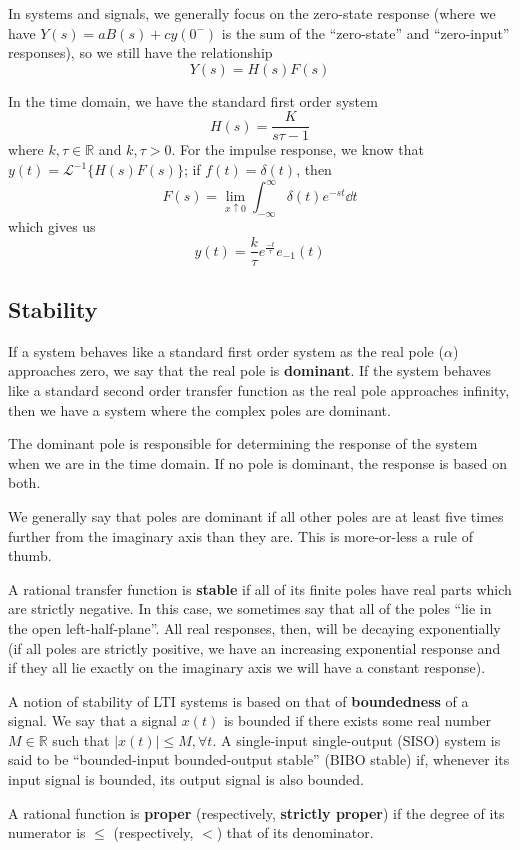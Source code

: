 \documentclass[12pt]{article}
\begin{document}
In systems and signals, we generally focus on the zero-state response (where we have $Y(s) = aB(s) + cy(0^-)$ is the sum of the ``zero-state'' and ``zero-input'' responses), so we still have the relationship \[ Y(s) = H(s)F(s) \]

In the time domain, we have the standard first order system \[ H(s) = \frac{K}{s\tau - 1} \] where $k, \tau \in \mathbb{R}$ and $k, \tau > 0$. For the impulse response, we know that $y(t) = \mathcal{L}^{-1} \{ H(s)F(s) \}$; if $f(t) = \delta(t)$, then \[ F(s) = \lim_{x\uparrow 0} \int_{-\infty}^\infty \delta(t) e^{-st} \dd t \] which gives us \[ y(t) = \frac{k}{\tau} e^{\frac{-t}{\tau}} e_{-1}(t) \]

\subsection{Stability}
If a system behaves like a standard first order system as the real pole ($\alpha$) approaches zero, we say that the real pole is {\bf dominant}. If the system behaves like a standard second order transfer function as the real pole approaches infinity, then we have a system where the complex poles are dominant.

The dominant pole is responsible for determining the response of the system when we are in the time domain. If no pole is dominant, the response is based on both.

We generally say that poles are dominant if all other poles are at least five times further from the imaginary axis than they are. This is more-or-less a rule of thumb.

A rational transfer function is {\bf stable} if all of its finite poles have real parts which are strictly negative. In this case, we sometimes say that all of the poles ``lie in the open left-half-plane''. All real responses, then, will be decaying exponentially (if all poles are strictly positive, we have an increasing exponential response and if they all lie exactly on the imaginary axis we will have a constant response).

A notion of stability of LTI systems is based on that of {\bf boundedness} of a signal. We say that a signal $x(t)$ is bounded if there exists some real number $M \in \mathbb{R}$ such that $|x(t)| \leq M, \forall t$. A single-input single-output (SISO) system is said to be ``bounded-input bounded-output stable'' (BIBO stable) if, whenever its input signal is bounded, its output signal is also bounded.

A rational function is {\bf proper} (respectively, {\bf strictly proper}) if the degree of its numerator is $\leq$ (respectively, $<$) that of its denominator.
\end{document}
